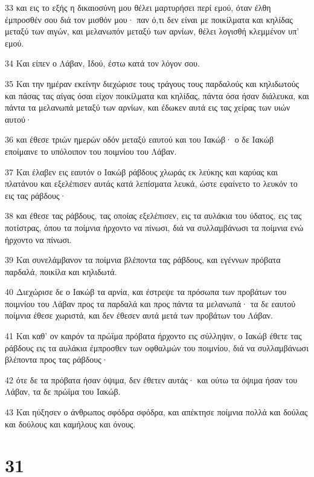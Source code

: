 \par 33 και εις το εξής η δικαιοσύνη μου θέλει μαρτυρήσει περί εμού, όταν έλθη έμπροσθέν σου διά τον μισθόν μου· παν ό,τι δεν είναι με ποικίλματα και κηλίδας μεταξύ των αιγών, και μελανωπόν μεταξύ των αρνίων, θέλει λογισθή κλεμμένον υπ' εμού.
\par 34 Και είπεν ο Λάβαν, Ιδού, έστω κατά τον λόγον σου.
\par 35 Και την ημέραν εκείνην διεχώρισε τους τράγους τους παρδαλούς και κηλιδωτούς και πάσας τας αίγας όσαι είχον ποικίλματα και κηλίδας, πάντα όσα ήσαν διάλευκα, και πάντα τα μελανωπά μεταξύ των αρνίων, και έδωκεν αυτά εις τας χείρας των υιών αυτού·
\par 36 και έθεσε τριών ημερών οδόν μεταξύ εαυτού και του Ιακώβ· ο δε Ιακώβ εποίμαινε το υπόλοιπον του ποιμνίου του Λάβαν.
\par 37 Και έλαβεν εις εαυτόν ο Ιακώβ ράβδους χλωράς εκ λεύκης και καρύας και πλατάνου και εξελέπισεν αυτάς κατά λεπίσματα λευκά, ώστε εφαίνετο το λευκόν το εις τας ράβδους·
\par 38 και έθεσε τας ράβδους, τας οποίας εξελέπισεν, εις τα αυλάκια του ύδατος, εις τας ποτίστρας, όπου τα ποίμνια ήρχοντο να πίνωσι, διά να συλλαμβάνωσι τα ποίμνια ενώ ήρχοντο να πίνωσι.
\par 39 Και συνελάμβανον τα ποίμνια βλέποντα τας ράβδους, και εγέννων πρόβατα παρδαλά, ποικίλα και κηλιδωτά.
\par 40 Διεχώρισε δε ο Ιακώβ τα αρνία, και έστρεψε τα πρόσωπα των προβάτων του ποιμνίου του Λάβαν προς τα παρδαλά και προς πάντα τα μελανωπά· τα δε εαυτού ποίμνια έθεσε χωριστά, και δεν έθεσεν αυτά μετά των προβάτων του Λάβαν.
\par 41 Και καθ' ον καιρόν τα πρώϊμα πρόβατα ήρχοντο εις σύλληψιν, ο Ιακώβ έθετε τας ράβδους εις τα αυλάκια έμπροσθεν των οφθαλμών του ποιμνίου, διά να συλλαμβάνωσι βλέποντα προς τας ράβδους·
\par 42 ότε δε τα πρόβατα ήσαν όψιμα, δεν έθετεν αυτάς· και ούτω τα όψιμα ήσαν του Λάβαν, τα δε πρώϊμα του Ιακώβ.
\par 43 Και ηύξησεν ο άνθρωπος σφόδρα σφόδρα, και απέκτησε ποίμνια πολλά και δούλας και δούλους και καμήλους και όνους.

\chapter{31}

